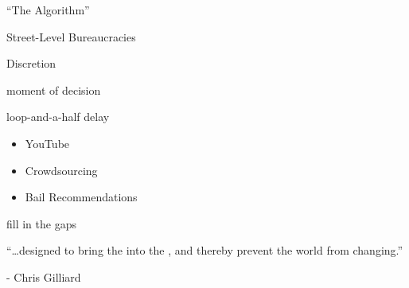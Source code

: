 \documentclass[aspectratio=169,17pt]{beamer} %
\begin{document}
\begin{frame}[standout]
``The Algorithm''
\end{frame}



\begin{frame}[standout]
Street-Level Bureaucracies
\end{frame}


\begin{frame}[standout]
Discretion
\end{frame}


\begin{frame}[standout]
moment of decision
\end{frame}



\begin{frame}[standout]
loop-and-a-half delay
\end{frame}



\begin{frame}[plain]
    
\begin{itemize}
  \item YouTube
  \item Crowdsourcing
  \item Bail Recommendations
\end{itemize}

\end{frame}


\begin{frame}[standout]
fill in the gaps
\end{frame}


\begin{frame}[plain]
\centering
``\dots designed to bring the  into the , and thereby {prevent} the world from changing.''

\hfill - Chris Gilliard
\end{frame}


\begin{frame}[plain]

\centering


\end{frame}
\end{document}
